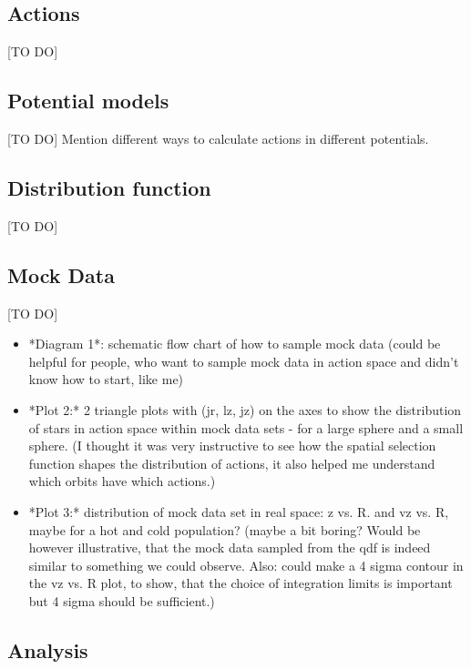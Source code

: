 \documentclass[12pt,preprint]{aastex}
\begin{document}
\subsection{Actions}

[TO DO]

\subsection{Potential models}

[TO DO] Mention different ways to calculate actions in different potentials.

\subsection{Distribution function}

[TO DO]

\subsection{Mock Data}

[TO DO]

\begin{itemize}
\item *Diagram 1*: schematic flow chart of how to sample mock data (could be helpful for people, who want to sample mock data in action space and didn't know how to start, like me)
\item *Plot 2:* 2 triangle plots with (jr, lz, jz) on the axes to show the distribution of stars in action space within mock data sets - for a large sphere and a small sphere. (I thought it was very instructive to see how the spatial selection function shapes the distribution of actions, it also helped me understand which orbits have which actions.)
\item *Plot 3:* distribution of mock data set in real space: z vs. R. and vz vs. R, maybe for a hot and cold population? (maybe a bit boring? Would be however illustrative, that the mock data sampled from the qdf is indeed similar to something we could observe. Also: could make a 4 sigma contour in the vz vs. R plot, to show, that the choice of integration limits is important but 4 sigma should be sufficient.)
\end{itemize}

\subsection{Analysis}
\end{document}

